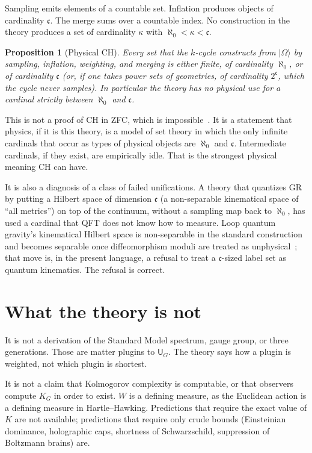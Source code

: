 \documentclass[11pt,a4paper]{article}
\theoremstyle{plain}
\newtheorem{proposition}[theorem]{Proposition}
\theoremstyle{definition}
\theoremstyle{remark}
\newcommand{\alef}{\aleph_{0}}
\newcommand{\cont}{\mathfrak{c}}
\newcommand{\KG}{K_{G}}
\newcommand{\UTM}{\mathsf{U}_{G}}
\newcommand{\ket}[1]{\lvert#1\rangle}
\begin{document}
Sampling emits elements of a countable set.
Inflation produces objects of cardinality $\cont$.
The merge sums over a countable index.
No construction in the theory produces a set of cardinality $\kappa$ with $\alef<\kappa<\cont$.

\begin{proposition}[Physical CH]
\label{prop:ch}
Every set that the $k$-cycle constructs from $\ket{\Omega}$ by sampling, inflation, weighting, and merging is either finite, of cardinality $\alef$, or of cardinality $\cont$ (or, if one takes power sets of geometries, of cardinality $2^{\cont}$, which the cycle never samples).
In particular the theory has no physical use for a cardinal strictly between $\alef$ and $\cont$.
\end{proposition}

This is not a proof of $\mathrm{CH}$ in ZFC, which is impossible~\cite{godel1940,cohen1963}.
It is a statement that physics, if it is this theory, is a model of set theory in which the only infinite cardinals that occur as types of physical objects are $\alef$ and $\cont$.
Intermediate cardinals, if they exist, are empirically idle.
That is the strongest physical meaning $\mathrm{CH}$ can have.

It is also a diagnosis of a class of failed unifications.
A theory that quantizes GR by putting a Hilbert space of dimension $\cont$ (a non-separable kinematical space of ``all metrics'') on top of the continuum, without a sampling map back to $\alef$, has used a cardinal that QFT does not know how to measure.
Loop quantum gravity's kinematical Hilbert space is non-separable in the standard construction and becomes separable once diffeomorphism moduli are treated as unphysical~\cite{fairbairn2004}; that move is, in the present language, a refusal to treat a $\cont$-sized label set as quantum kinematics.
The refusal is correct.

\section{What the theory is not}

It is not a derivation of the Standard Model spectrum, gauge group, or three generations.
Those are matter plugins to $\UTM$.
The theory says how a plugin is weighted, not which plugin is shortest.

It is not a claim that Kolmogorov complexity is computable, or that observers compute $\KG$ in order to exist.
$W$ is a defining measure, as the Euclidean action is a defining measure in Hartle--Hawking.
Predictions that require the exact value of $K$ are not available; predictions that require only crude bounds (Einsteinian dominance, holographic caps, shortness of Schwarzschild, suppression of Boltzmann brains) are.
\end{document}
